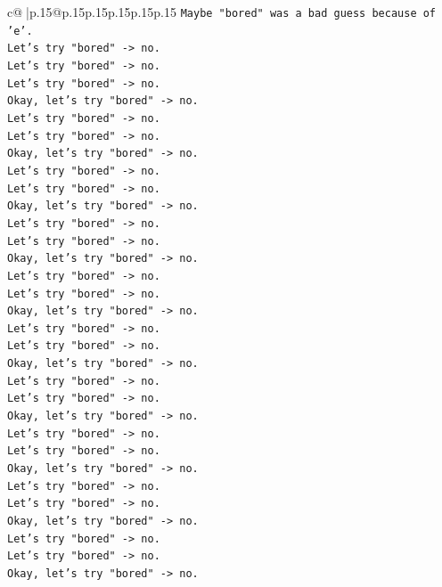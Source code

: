 \documentclass{article}
\begin{document}
{\begin{supertabular}{c@{$\;$}|p{.15\linewidth}@{}p{.15\linewidth}p{.15\linewidth}p{.15\linewidth}p{.15\linewidth}p{.15\linewidth}}
{{{\texttt{Maybe "bored" was a bad guess because of 'e'.} \\
\texttt{Let's try "bored" {-}> no.} \\
\texttt{Let's try "bored" {-}> no.} \\
\texttt{Let's try "bored" {-}> no.} \\
\texttt{Okay, let's try "bored" {-}> no.} \\
\texttt{Let's try "bored" {-}> no.} \\
\texttt{Let's try "bored" {-}> no.} \\
\texttt{Okay, let's try "bored" {-}> no.} \\
\texttt{Let's try "bored" {-}> no.} \\
\texttt{Let's try "bored" {-}> no.} \\
\texttt{Okay, let's try "bored" {-}> no.} \\
\texttt{Let's try "bored" {-}> no.} \\
\texttt{Let's try "bored" {-}> no.} \\
\texttt{Okay, let's try "bored" {-}> no.} \\
\texttt{Let's try "bored" {-}> no.} \\
\texttt{Let's try "bored" {-}> no.} \\
\texttt{Okay, let's try "bored" {-}> no.} \\
\texttt{Let's try "bored" {-}> no.} \\
\texttt{Let's try "bored" {-}> no.} \\
\texttt{Okay, let's try "bored" {-}> no.} \\
\texttt{Let's try "bored" {-}> no.} \\
\texttt{Let's try "bored" {-}> no.} \\
\texttt{Okay, let's try "bored" {-}> no.} \\
\texttt{Let's try "bored" {-}> no.} \\
\texttt{Let's try "bored" {-}> no.} \\
\texttt{Okay, let's try "bored" {-}> no.} \\
\texttt{Let's try "bored" {-}> no.} \\
\texttt{Let's try "bored" {-}> no.} \\
\texttt{Okay, let's try "bored" {-}> no.} \\
\texttt{Let's try "bored" {-}> no.} \\
\texttt{Let's try "bored" {-}> no.} \\
\texttt{Okay, let's try "bored" {-}> no.} \\
}}}
\end{supertabular}}
\end{document}
